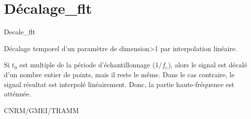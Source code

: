 %
\section{D\'ecalage\_flt}

 {\sf Decale\_flt}

D\'ecalage temporel d'un param\`etre de dimension>1 par
interpolation lin\'eaire. 

\bigskip






Si $t_0$ est multiple de la p\'eriode
d'\'echantillonnage ($1/f_e$), alors le signal
est d\'ecal\'e d'un nombre entier de points, mais il
reste le m\^eme. Dans le cas contraire, 
le signal r\'esultat est interpol\'e 
lin\'eairement. Donc,  
la partie haute-fr\'equence est att\'enu\'ee. 

CNRM/GMEI/TRAMM


